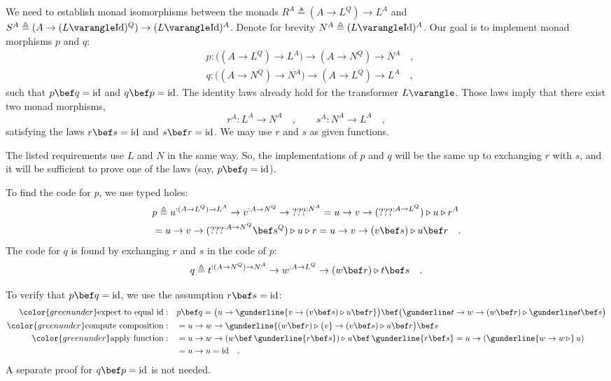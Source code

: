 We need to establish monad isomorphisms between the monads $R^{A}\triangleq(A\rightarrow L^{Q})\rightarrow L^{A}$
and $S^{A}\triangleq(A\rightarrow(L\varangle\text{Id})^{Q})\rightarrow(L\varangle\text{Id})^{A}$.
Denote for brevity $N^{A}\triangleq(L\varangle\text{Id})^{A}$. Our
goal is to implement monad morphisms $p$ and $q$:
\begin{align*}
 & p:\big((A\rightarrow L^{Q})\rightarrow L^{A}\big)\rightarrow(A\rightarrow N^{Q})\rightarrow N^{A}\quad,\\
 & q:\big((A\rightarrow N^{Q})\rightarrow N^{A}\big)\rightarrow(A\rightarrow L^{Q})\rightarrow L^{A}\quad,
\end{align*}
such that $p\bef q=\text{id}$ and $q\bef p=\text{id}$. The identity
laws already hold for the transformer $L\varangle$. Those laws imply
that there exist two monad morphisms,
\[
r^{A}:L^{A}\rightarrow N^{A}\quad,\quad\quad s^{A}:N^{A}\rightarrow L^{A}\quad,
\]
 satisfying the laws $r\bef s=\text{id}$ and $s\bef r=\text{id}$.
We may use $r$ and $s$ as given functions.

The listed requirements use $L$ and $N$ in the same way. So, the
implementations of $p$ and $q$ will be the same up to exchanging
$r$ with $s$, and it will be sufficient to prove one of the laws
(say, $p\bef q=\text{id}$).

To find the code for $p$, we use typed holes:
\begin{align*}
 & p\triangleq u^{:(A\rightarrow L^{Q})\rightarrow L^{A}}\rightarrow v^{:A\rightarrow N^{Q}}\rightarrow\text{???}^{:N^{A}}=u\rightarrow v\rightarrow(\text{???}^{:A\rightarrow L^{Q}})\triangleright u\triangleright r^{A}\\
 & =u\rightarrow v\rightarrow(\text{???}^{:A\rightarrow N^{Q}}\bef s^{Q})\triangleright u\triangleright r=u\rightarrow v\rightarrow(v\bef s)\triangleright u\bef r\quad.
\end{align*}
The code for $q$ is found by exchanging $r$ and $s$ in the code
of $p$:
\[
q\triangleq t^{:(A\rightarrow N^{Q})\rightarrow N^{A}}\rightarrow w^{:A\rightarrow L^{Q}}\rightarrow(w\bef r)\triangleright t\bef s\quad.
\]

To verify that $p\bef q=\text{id}$, we use the assumption $r\bef s=\text{id}$:
\begin{align*}
{\color{greenunder}\text{expect to equal }\text{id}:}\quad & p\bef q=\big(u\rightarrow\gunderline{v\rightarrow(v\bef s)\triangleright u\bef r}\big)\bef\big(\gunderline t\rightarrow w\rightarrow(w\bef r)\triangleright\gunderline t\bef s\big)\\
{\color{greenunder}\text{compute composition}:}\quad & =u\rightarrow w\rightarrow\gunderline{(w\bef r)\triangleright\big(v}\rightarrow(v\bef s)\triangleright u\bef r\big)\bef s\\
{\color{greenunder}\text{apply function}:}\quad & =u\rightarrow w\rightarrow(w\bef\,\gunderline{r\bef s})\triangleright u\bef\,\gunderline{r\bef s}=u\rightarrow(\gunderline{w\rightarrow w\,\triangleright}\,u)\\
 & =u\rightarrow u=\text{id}\quad.
\end{align*}
A separate proof for $q\bef p=\text{id}$ is not needed.

